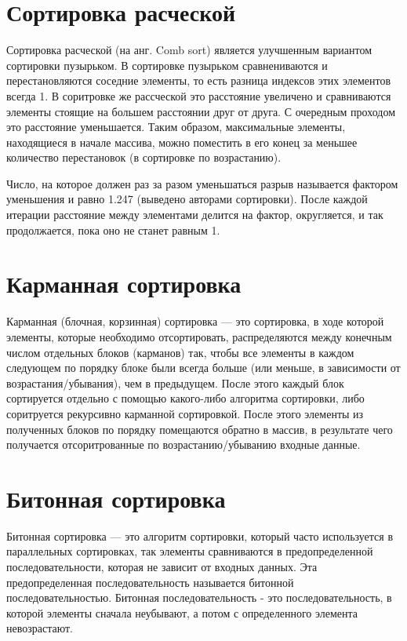 \documentclass[12pt]{report}
\begin{document}
	
	\section{Сортировка расческой}
	
	 Сортировка расческой (на анг. Comb sort) является улучшенным вариантом сортировки пузырьком. В сортировке пузырьком сравнениваются и перестановляются соседние элементы, то есть разница индексов этих элементов всегда 1. В соритровке же рассческой это расстояние увеличено и сравниваются элементы стоящие на большем расстоянии друг от друга. С очередным проходом это расстояние уменьшается. Таким образом, максимальные элементы, находящиеся в начале массива, можно поместить в его конец за меньшее количество перестановок (в сортировке по возрастанию). 
	 
	 Число, на которое должен раз за разом уменьшаться разрыв называется фактором уменьшения и равно 1.247 (выведено авторами сортировки). После каждой итерации расстояние между элементами делится на фактор, округляется, и так продолжается, пока оно не станет равным 1.
	
	\section{Карманная сортировка}
	
	Карманная (блочная, корзинная) сортировка  — это сортировка, в ходе которой элементы, которые необходимо отсортировать, распределяются между конечным числом отдельных блоков (карманов) так, чтобы все элементы в каждом следующем по порядку блоке были всегда больше (или меньше, в зависимости от возрастания/убывания), чем в предыдущем. После этого каждый блок сортируется отдельно с помощью какого-либо алгоритма сортировки, либо соритруется рекурсивно карманной сортировкой. После этого элементы из полученных блоков по порядку помещаются обратно в массив, в результате чего получается отсоритрованные по возрастанию/убыванию входные данные.

	
	\section{Битонная сортировка}
	
	Битонная сортировка — это алгоритм сортировки, который часто используется в параллельных сортировках, так элементы сравниваются в предопределенной последовательности, которая не зависит от входных данных. Эта предопределенная последовательность называется битонной последовательностью. Битонная последовательность - это последовательность, в которой элементы сначала неубывают, а потом с определенного элемента невозрастают.
	
\end{document}
